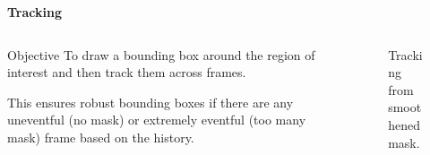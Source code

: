 \begin{frame}{\textbf{Tracking}}
\begin{columns}
	\begin{column}{0.48\textwidth}
		\begin{varblock}[\textwidth]{Objective}
			To draw a bounding box around the region of interest and then track them across frames.
		\end{varblock}
		\begin{varblock}[\textwidth]{}
			This ensures robust bounding boxes if there are any uneventful (no mask) or extremely eventful (too many mask) frame based on the history.			
		\end{varblock}
	\end{column}
	\begin{column}{0.48\textwidth}
		\begin{figure}
			\centering
				\caption{Tracking from smoothened mask.}
		\end{figure}
	\end{column}
\end{columns}	
\end{frame}